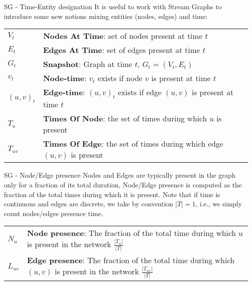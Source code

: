 \begin{textbox}{SG - Time-Entity designation}
    It is useful to work with Stream Graphs to introduce some new notions mixing entities (nodes, edges) and time:


    \begin{tabular}{p{}|p{}}\scriptsize
        $V_{t}$   & \textbf{Nodes At Time}: set of nodes present at time $t$                      \\
        $E_{t}$   & \textbf{Edges At Time}: set of edges present at time $t$                      \\
        $G_t$     & \textbf{Snapshot}: Graph at time $t$, $G_t=(V_t,E_t)$                         \\
        $v_t$     & \textbf{Node-time}: $v_t$ exists if node $v$ is present at time $t$           \\
        $(u,v)_t$ & \textbf{Edge-time}: $(u,v)_t$ exists if edge $(u,v)$ is present at time $t$   \\
        $T_u$     & \textbf{Times Of Node}: the set of times during which $u$ is present          \\
        $T_{uv}$  & \textbf{Times Of Edge}: the set of times during which edge $(u,v)$ is present \\
    \end{tabular}
\end{textbox}


\begin{textbox}{SG - Node/Edge presence}
    Nodes and Edges are typically present in the graph only for a fraction of its total duration, Node/Edge presence is computed as the fraction of the total times during which it is present. Note that if time is continuous and edges are discrete, we take by convention $|T|=1$, i.e., we simply count nodes/edges presence time.


    \begin{tabular}{p{}|p{}}\scriptsize

        $N_u$    & \textbf{Node presence}: The fraction of the total time during which $u$ is present in the network $\frac{|T_u|}{|T|}$        \\
        $L_{uv}$ & \textbf{Edge presence}: The fraction of the total time during which $(u,v)$ is present in the network $\frac{|T_{uv}|}{|T|}$ \\
    \end{tabular}
\end{textbox}


